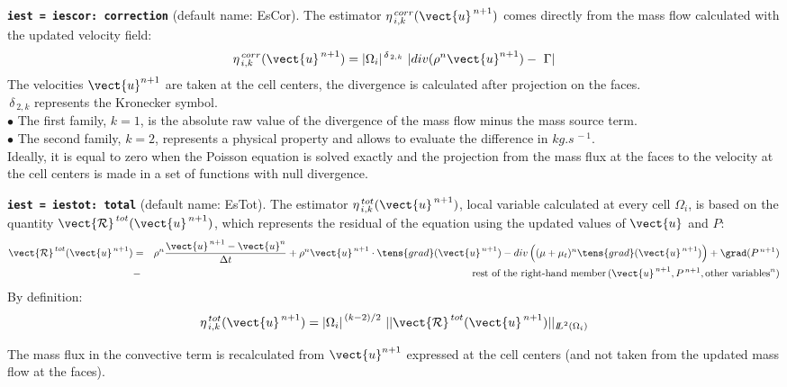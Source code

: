{\tt \bf iest = iescor: correction}  (default name: EsCor).
The estimator $ \eta^{\,corr}_{\,i,k}(\vect{u}^{\,n+1})$ comes directly
from the mass flow calculated with the updated velocity field:
\begin{eqnarray*}
            \eta^{\,corr}_{\,i,k}(\vect{u}^{\,n+1})=
|\Omega_i|^{\,\delta_{\,2,k}}\ |div (\rho^n \vect{u}^{n+1}) -\ \Gamma|
\end{eqnarray*}
The velocities $\vect{u}^{n+1}$ are taken at the cell centers,
the divergence is calculated after projection on the faces.\\
            $ \,\delta_{\,2,k}$ represents the Kronecker symbol.\\
\hspace*{0.5cm}$\bullet$ The first family, $k=1$, is the absolute raw
value of the divergence of the mass flow minus the mass source term.\\
\hspace*{0.5cm}$\bullet$ The second family, $k=2$, represents a physical
property and allows to evaluate the difference in $kg.s^{\,-1}$.\\
Ideally, it is equal to zero when the Poisson equation is solved exactly and
the projection from the mass flux at the faces to the velocity at the cell
centers is made in a set of  functions with null divergence.

{\tt \bf iest = iestot: total} (default name: EsTot).
The estimator $ \eta^{\,tot}_{\,i,k}(\vect{u}^{\,n+1})$, local variable
calculated at every cell $\Omega_i$, is based on the quantity
$\vect{\mathcal R}^{\,tot}(\vect{u}^{\,n+1})$, which represents the
residual of the equation using the updated values of
$\vect{u}$ and $P$:
\begin{eqnarray*}
\vect{\mathcal R}^{\,tot}(\vect{u}^{\,n+1})&= & \rho^n \frac{\vect{u}^{\,n+1}-\vect{u}^n}{\Delta t}
              + \rho^n \vect{u}^{\,n+1} \cdot \tens{grad}(\vect{u}^{\,n+1})
              - div \left((\mu+\mu_t)^n \tens{grad}(\vect{u}^{\,n+1}) \right)
              + \grad(P^{\,n+1})     \\
              &- &\text{rest of the right-hand member}
                        \,(\vect{u}^{\,n+1}, P^{\,n+1}, \text{other variables}^n)
\end{eqnarray*}
By definition:
$$ \eta^{\,tot}_{\,i,k}(\vect{u}^{\,n+1})= {|\Omega_i|}^{\,(k-2)/2}\ ||\vect{\mathcal R}^{\,tot}(\vect{u}^{\,n+1})||
_{{I\hspace{-.25em}L}^{2}(\Omega_i)}$$

The mass flux in the convective term is recalculated from $\vect{u}^{n+1}$
expressed at the cell centers (and not taken from the updated mass flow at the
faces).\\

